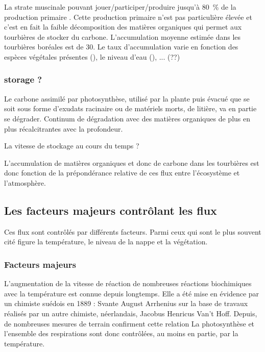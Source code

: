La strate muscinale pouvant jouer/participer/produire jusqu'à \SI{80}{\percent} de la production primaire \cite{francez2000}.
Cette production primaire n'est pas particulière élevée \plop et c'est en fait la faible décomposition des matières organiques qui permet aux tourbières de stocker du carbone.
L'accumulation moyenne estimée dans les tourbières boréales est de \SI{30}{\gcm}. Le taux d'accumulation varie en fonction des espèces végétales présentes (\plop), le niveau d'eau (\plop), ... (??)



\subsubsection{storage ?}

Le carbone assimilé par photosynthèse, utilisé par la plante puis évacué que se soit sous forme d'exudats racinaire ou de matériels morts, de litière, va en partie se dégrader.
Continum de dégradation avec des matières organiques de plus en plus récalcitrantes avec la profondeur.

La vitesse de stockage au cours du temps ?

L'accumulation de matières organiques et donc de carbone dans les tourbières est donc fonction de la prépondérance relative de ces flux entre l'écosystème et l'atmosphère.

\subsection{Les facteurs majeurs contrôlant les flux}



Ces flux sont contrôlés par différents facteurs.
Parmi ceux qui sont le plus souvent cité figure la température, le niveau de la nappe et la végétation.

\subsubsection{Facteurs majeurs}
L'augmentation de la vitesse de réaction de nombreuses réactions biochimiques avec la température est connue depuis longtemps.
Elle a été mise en évidence par un chimiste suédois en 1889 : Svante August Arrhenius sur la base de travaux réalisés par un autre chimiste, néerlandais, Jacobus Henricus Van't Hoff.
Depuis, de nombreuses mesures de terrain confirment cette relation \plop
La photosynthèse et l'ensemble des respirations sont donc contrôlées, au moins en partie, par la température.





